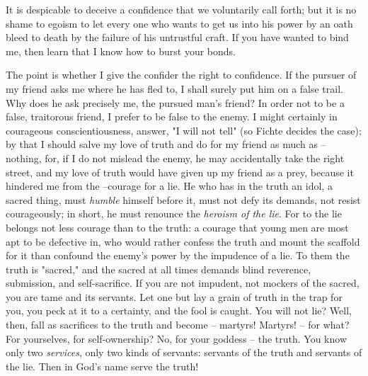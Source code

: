 It is despicable to deceive a confidence that we voluntarily call forth; but 
it is no shame to egoism to let every one who wants to get us into his power 
by an oath bleed to death by the failure of his untrustful craft. If you have 
wanted to bind me, then learn that I know how to burst your bonds.

The point is whether I give the confider the right to confidence. If the 
pursuer of my friend asks me where he has fled to, I shall surely put him on a 
false trail. Why does he ask precisely me, the pursued man's friend? In order 
not to be a false, traitorous friend, I prefer to be false to the enemy. I 
might certainly in courageous conscientiousness, answer, "{}I will not tell"{} 
(so Fichte decides the case); by that I should salve my love of truth and do 
for my friend as much as -- nothing, for, if I do not mislead the enemy, he 
may accidentally take the right street, and my love of truth would have given 
up my friend as a prey, because it hindered me from the --courage for a lie. 
He who has in the truth an idol, a sacred thing, must \textit{humble} himself 
before it, must not defy its demands, not resist courageously; in short, he 
must renounce the \textit{heroism of the lie}. For to the lie belongs not less 
courage than to the truth: a courage that young men are most apt to be 
defective in, who would rather confess the truth and mount the scaffold for it 
than confound the enemy's power by the impudence of a lie. To them the truth 
is "{}sacred,"{} and the sacred at all times demands blind reverence, 
submission, and self-sacrifice. If you are not impudent, not mockers of the 
sacred, you are tame and its servants. Let one but lay a grain of truth in the 
trap for you, you peck at it to a certainty, and the fool is caught. You will 
not lie? Well, then, fall as sacrifices to the truth and become -- martyrs! 
Martyrs! -- for what? For yourselves, for self-ownership? No, for your goddess 
-- the truth. You know only two \textit{services}, only two kinds of servants: 
servants of the truth and servants of the lie. Then in God's name serve the 
truth!

